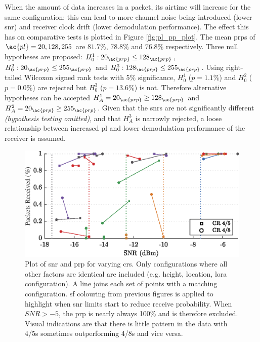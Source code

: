 When the amount of data increases in a packet, its airtime will increase for the same configuration; this can lead to more channel noise being introduced (lower \ac{snr}) and receiver clock drift (lower demodulation performance). The effect this has on comparative tests is plotted in Figure \ref{fig:pl_pp_plot}. The mean \ac{prp}s of $\ac{pl} = 20, 128, 255$ are $81.7\%$, $78.8\%$ and $76.8\%$ respectively.  Three null hypotheses are proposed: $H^1_{0} : 20_{\ac{prp}} \leq 128_{\ac{prp}}$, $H^2_{0} : 20_{\ac{prp}} \leq 255_{\ac{prp}}$ and $H^3_{0} : 128_{\ac{prp}} \leq 255_{\ac{prp}}$. Using right-tailed Wilcoxon signed rank tests with 5\% significance, $H^1_{0}$ ($p=1.1\%$) and $H^2_{0}$ ($p=0.0\%$) are rejected but $H^3_{0}$ ($p=13.6\%$) is not. Therefore alternative hypotheses can be accepted  $H^1_{A}=20_{\ac{prp}} \geq 128_{\ac{prp}}$ and $H^2_{A}=20_{\ac{prp}} \geq 255_{\ac{prp}}$. Given that the \ac{snr}s are not significantly different \textit{(hypothesis testing omitted)}, and that $H^3_{A}$ is narrowly rejected, a loose relationship between increased \ac{pl} and lower demodulation performance of the receiver is assumed.


\begin{figure}[H]
    \centering
   	\includegraphics{Figures/cr_pp_plot}
    \caption[Effect of Coding Rate on \ac{snr} and \ac{prp}]{
    Plot of \ac{snr} and \ac{prp} for varying \ac{cr}s. Only configurations where all other factors are identical are included (e.g. height, location, \ac{lora} configuration). A line joins each set of points with a matching configuration. \ac{sf} colouring from previous figures is applied to highlight when \ac{snr} limits start to reduce receive probability. When $SNR > -5$, the \ac{prp} is nearly always 100\% and is therefore excluded. Visual indications are that there is little pattern in the data with 4/5s sometimes outperforming 4/8s and vice versa.
    }
    \label{fig:cr_pp_plot}
\end{figure}

